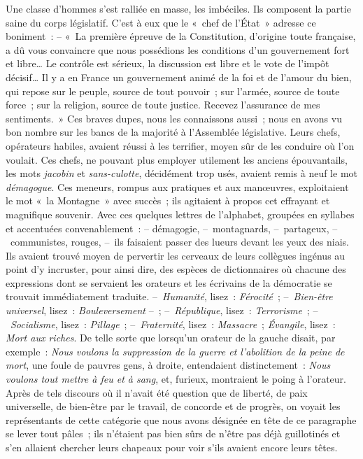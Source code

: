 \documentclass[french,twoside]{book} %
\begin{document}
Une classe d’hommes s’est ralliée en masse, les imbéciles. Ils composent la partie saine du corps législatif. C’est à eux que le « chef de l’État » adresse ce boniment : – « La première épreuve de la Constitution, d’origine toute française, a dû vous convaincre que nous possédions les conditions d’un gouvernement fort et libre… Le contrôle est sérieux, la discussion est libre et le vote de l’impôt décisif… Il y a en France un gouvernement animé de la foi et de l’amour du bien, qui repose sur le peuple, source de tout pouvoir ; sur l’armée, source de toute force ; sur la religion, source de toute justice. Recevez l’assurance de mes sentiments. » Ces braves dupes, nous les connaissons aussi ; nous en avons vu bon nombre sur les bancs de la majorité à l’Assemblée législative. Leurs chefs, opérateurs habiles, avaient réussi à les terrifier, moyen sûr de les conduire où l’on voulait. Ces chefs, ne pouvant plus employer utilement les anciens épouvantails, les mots \emph{jacobin} et \emph{sans-culotte}, décidément trop usés, avaient remis à neuf le mot \emph{démagogue}. Ces meneurs, rompus aux pratiques et aux manœuvres, exploitaient le mot « la Montagne » avec succès ; ils agitaient à propos cet effrayant et magnifique souvenir. Avec ces quelques lettres de l’alphabet, groupées en syllabes et accentuées convenablement : – démagogie, – montagnards, – partageux, – communistes, rouges, – ils faisaient passer des lueurs devant les yeux des niais. Ils avaient trouvé moyen de pervertir les cerveaux de leurs collègues ingénus au point d’y incruster, pour ainsi dire, des espèces de dictionnaires où chacune des expressions dont se servaient les orateurs et les écrivains de la démocratie se trouvait immédiatement traduite. – \emph{Humanité}, lisez : \emph{Férocité} ; – \emph{Bien-être universel}, lisez : \emph{Bouleversement} – ; – \emph{République}, lisez : \emph{Terrorisme} ; – \emph{Socialisme}, lisez : \emph{Pillage} ; – \emph{Fraternité}, lisez : \emph{Massacre} ; \emph{Évangile}, lisez : \emph{Mort aux riches}. De telle sorte que lorsqu’un orateur de la gauche disait, par exemple : \emph{Nous voulons la suppression de la guerre et l’abolition de la peine de mort}, une foule de pauvres gens, à droite, entendaient distinctement : \emph{Nous voulons tout mettre à feu et à sang}, et, furieux, montraient le poing à l’orateur. Après de tels discours où il n’avait été question que de liberté, de paix universelle, de bien-être par le travail, de concorde et de progrès, on voyait les représentants de cette catégorie que nous avons désignée en tête de ce paragraphe se lever tout pâles ; ils n’étaient pas bien sûrs de n’être pas déjà guillotinés et s’en allaient chercher leurs chapeaux pour voir s’ils avaient encore leurs têtes.\par
\end{document}
